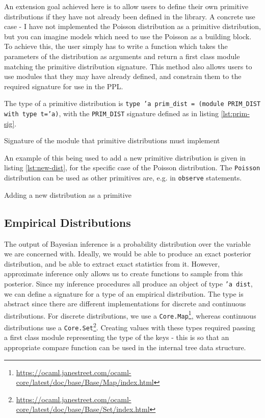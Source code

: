 An extension goal achieved here is to allow users to define their own primitive distributions if they have not already been defined in the library. A concrete use case - I have not implemented the Poisson distribution as a primitive distribution, but you can imagine models which need to use the Poisson as a building block. To achieve this, the user simply has to write a function which takes the parameters of the distribution as arguments and return a first class module matching the primitive distribution signature. This method also allows users to use modules that they may have already defined, and constrain them to the required signature for use in the PPL.

The type of a primitive distribution is \texttt{type 'a prim\_dist = (module PRIM\_DIST with type t='a)}, with the \texttt{PRIM\_DIST} signature defined as in listing \ref{lst:prim-sig}. 

\begin{listing}[!ht]
	\caption{Signature of the module that primitive distributions must implement}
	\label{lst:prim-sig}
\end{listing}

An example of this being used to add a new primitive distribution is given in listing \ref{lst:new-dist}, for the specific case of the Poisson distribution. The \texttt{Poisson} distribution can be used as other primitives are, e.g. in \texttt{observe} statements.

\begin{listing}[!ht]
	\caption{Adding a new distribution as a primitive}
	\label{lst:new-dist}
\end{listing}

\subsection{Empirical Distributions}

The output of Bayesian inference is a probability distribution over the variable we are concerned with. Ideally, we would be able to produce an exact posterior distribution, and be able to extract exact statistics from it. However, approximate inference only allows us to create functions to sample from this posterior. Since my inference procedures all produce an object of type \texttt{'a dist}, we can define a signature for a type of an empirical distribution. The type is abstract since there are different implementations for discrete and continuous distributions. For discrete distributions, we use a \texttt{Core.Map}\footnote{\url{https://ocaml.janestreet.com/ocaml-core/latest/doc/base/Base/Map/index.html}}, whereas continuous distributions use a \texttt{Core.Set}\footnote{\url{https://ocaml.janestreet.com/ocaml-core/latest/doc/base/Base/Set/index.html}}. Creating values with these types required passing a first class module representing the type of the keys - this is so that an appropriate compare function can be used in the internal tree data structure.

